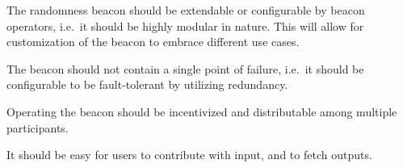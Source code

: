 \begin{enumberate}
\item The randomness beacon should be extendable or configurable by beacon operators, i.e.\ it should be highly modular in nature.
      This will allow for customization of the beacon to embrace different use cases.
\item The beacon should not contain a single point of failure, i.e.\ it should be configurable to be fault-tolerant by utilizing redundancy.
\item Operating the beacon should be incentivized and distributable among multiple participants. 
\item It should be easy for users to contribute with input, and to fetch outputs.
\end{enumberate}



